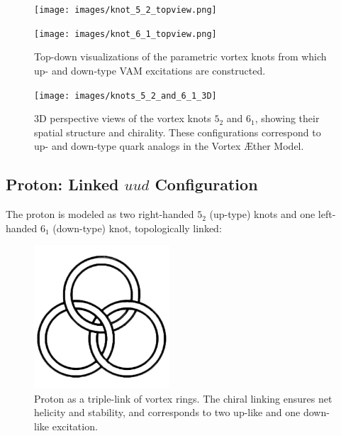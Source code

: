 \begin{figure}[H]
\centering
\begin{minipage}{0.45\textwidth}
    \centering
             \texttt{[image: images/knot\_5\_2\_topview.png]}
\end{minipage}
\hfill
\begin{minipage}{0.45\textwidth}
    \centering
            \texttt{[image: images/knot\_6\_1\_topview.png]}
\end{minipage}
     \caption{Top-down visualizations of the parametric vortex knots from which up- and down-type VAM excitations are constructed.}
\end{figure}


\begin{figure}[H]
    \centering
    \texttt{[image: images/knots\_5\_2\_and\_6\_1\_3D]}
    \caption{3D perspective views of the vortex knots \(5_2\) and \(6_1\), showing their spatial structure and chirality. These configurations correspond to up- and down-type quark analogs in the Vortex \AE ther Model.}
\end{figure}


\subsection{Proton: Linked \(uud\) Configuration}

The proton is modeled as two right-handed \( 5_2 \) (up-type) knots and one left-handed \( 6_1 \) (down-type) knot, topologically linked:

\begin{figure}[H]
    \centering
    \includegraphics[width=0.45\textwidth]{images/aborromean}
    \caption{Proton as a triple-link of vortex rings. The chiral linking ensures net helicity and stability, and corresponds to two up-like and one down-like excitation.}
\end{figure}

